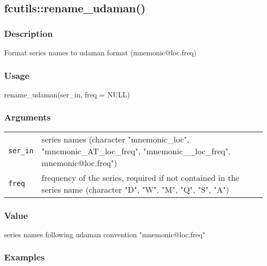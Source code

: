 \documentclass[
  letterpaper,
  DIV=11,
  numbers=noendperiod]{scrreport}
\newenvironment{Shaded}{\begin{snugshade}}{\end{snugshade}}
\newcommand{\AttributeTok}[1]{\textcolor[rgb]{0.40,0.45,0.13}{#1}}
\newcommand{\ConstantTok}[1]{\textcolor[rgb]{0.56,0.35,0.01}{#1}}
\newcommand{\FunctionTok}[1]{\textcolor[rgb]{0.28,0.35,0.67}{#1}}
\newcommand{\NormalTok}[1]{\textcolor[rgb]{0.00,0.23,0.31}{#1}}
\begin{document}
\subsection{fcutils::rename\_udaman()}\label{fcutilsrename_udaman}

\subsubsection{Description}\label{description-59}

Format series names to udaman format (mnemonic@loc.freq)

\subsubsection{Usage}\label{usage-59}

\begin{Shaded}
\begin{Highlighting}[]
\FunctionTok{rename\_udaman}\NormalTok{(ser\_in, }\AttributeTok{freq =} \ConstantTok{NULL}\NormalTok{)}
\end{Highlighting}
\end{Shaded}

\subsubsection{Arguments}\label{arguments-59}

\begin{longtable}[]{@{}ll@{}}
\toprule\noalign{}
\endhead
\bottomrule\noalign{}
\endlastfoot
\texttt{ser\_in} & series names (character "mnemonic\_loc",
"mnemonic\_AT\_loc\_freq", "mnemonic\_\_loc\_freq",
mnemonic@loc.freq") \\
\texttt{freq} & frequency of the series, required if not contained in
the series name (character "D", "W", "M", "Q", "S", "A") \\
\end{longtable}

\subsubsection{Value}\label{value-59}

series names following udaman convention "mnemonic@loc.freq"

\subsubsection{Examples}\label{examples-59}
\end{document}
